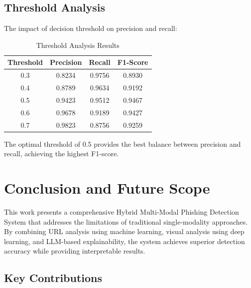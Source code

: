 \documentclass[12pt,a4paper]{report}
\begin{document}
\section{Threshold Analysis}

The impact of decision threshold on precision and recall:

\begin{table}[h!]
\centering
\caption{Threshold Analysis Results}
\label{tab:threshold}
\begin{tabular}{|c|c|c|c|}
\hline
\textbf{Threshold} & \textbf{Precision} & \textbf{Recall} & \textbf{F1-Score} \\
\hline
0.3 & 0.8234 & 0.9756 & 0.8930 \\
0.4 & 0.8789 & 0.9634 & 0.9192 \\
0.5 & 0.9423 & 0.9512 & 0.9467 \\
0.6 & 0.9678 & 0.9189 & 0.9427 \\
0.7 & 0.9823 & 0.8756 & 0.9259 \\
\hline
\end{tabular}
\end{table}

The optimal threshold of 0.5 provides the best balance between precision and recall, achieving the highest F1-score.

\chapter{Conclusion and Future Scope}

This work presents a comprehensive Hybrid Multi-Modal Phishing Detection System that addresses the limitations of traditional single-modality approaches. By combining URL analysis using machine learning, visual analysis using deep learning, and LLM-based explainability, the system achieves superior detection accuracy while providing interpretable results.

\section{Key Contributions}
\end{document}
